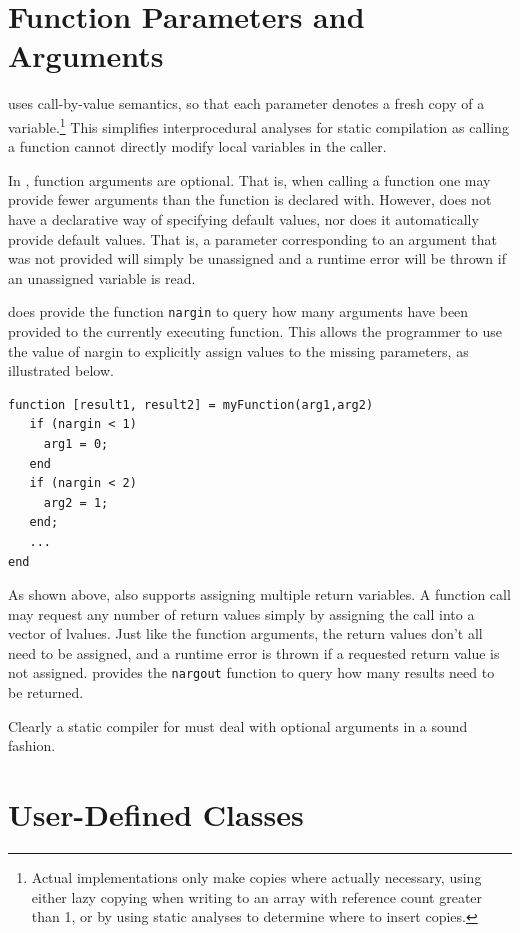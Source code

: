 \section{Function Parameters and Arguments }

\matlab uses call-by-value semantics,  so that each parameter denotes a fresh
copy of a variable.\footnote{Actual \matlab implementations only make copies
where actually necessary, using either lazy copying when writing to an array
with reference count greater than 1, or by using static analyses to determine
where to insert copies\cite{CC2011}.}  This simplifies interprocedural
analyses for static compilation as calling a function cannot directly modify
local variables in the caller.

In \matlab, function arguments are  optional.  That is, when calling a function
one may provide fewer arguments than the function is declared with.  However,
\matlab does not have a declarative way of specifying default values, nor does
it automatically provide default values. That is, a parameter corresponding to
an argument that was not provided will simply be unassigned and a runtime error
will be thrown if an unassigned variable is read. 

\matlab does provide the function {\tt nargin} to query how many
arguments have been provided to the currently executing function. This allows
the programmer to use the value of nargin to explicitly assign values to the
missing parameters, as illustrated below.

\begin{lstlisting}
function [result1, result2] = myFunction(arg1,arg2)
   if (nargin < 1)  
     arg1 = 0;
   end
   if (nargin < 2)
     arg2 = 1;
   end;
   ...
end
\end{lstlisting}

As shown above, \matlab also supports assigning multiple return
variables. A function call may request any number of return values
simply by assigning the call into a vector of lvalues. Just like the
function arguments, the return values don't all need to be assigned,
and a runtime error is thrown if a requested return value is not
assigned. \matlab provides the {\tt nargout} function to query how
many results need to be returned.

Clearly a static compiler for \matlab must deal with optional arguments in a
sound fashion.



\section{\matlab User-Defined Classes}
\label{sec:classes}

